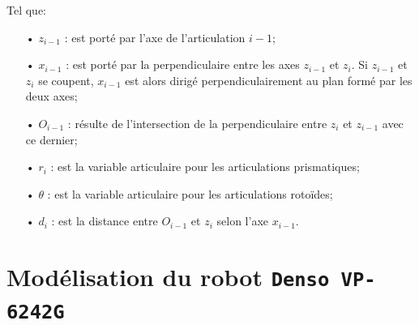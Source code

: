 \documentclass[12pt,a4paper,twoside]{report}
\begin{document}
Tel que:
\begin{itemize}
\item[•] $z_{i-1}$ : est porté par l'axe de l'articulation $i-1$;
\item[•] $x_{i-1}$ : est porté par la perpendiculaire entre les axes $z_{i-1}$ et $z_i$. Si $z_{i-1}$ et $z_i$ se coupent, $x_{i-1}$ est alors dirigé perpendiculairement au plan formé par les deux axes;
\item[•] $O_{i-1}$ : résulte de l'intersection de la perpendiculaire entre $z_i$ et $z_{i-1}$ avec ce dernier;
\item[•] $r_i$ : est la variable articulaire pour les articulations prismatiques;
\item[•] $\theta$ : est la variable articulaire pour les articulations rotoïdes;
\item[•] $d_i$ : est la distance entre $O_{i-1}$ et $z_i$ selon l'axe $x_{i-1}$.
\end{itemize}


\section{Modélisation du robot \texttt{Denso VP-6242G}}
\label{Model_denso}
\end{document}

